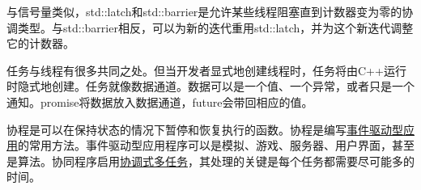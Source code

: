 与信号量类似，std::latch和std::barrier是允许某些线程阻塞直到计数器变为零的协调类型。与std::barrier相反，可以为新的迭代重用std::latch，并为这个新迭代调整它的计数器。

任务与线程有很多共同之处。但当开发者显式地创建线程时，任务将由C++运行时隐式地创建。任务就像数据通道。数据可以是一个值、一个异常，或者只是一个通知。promise将数据放入数据通道，future会带回相应的值。

协程是可以在保持状态的情况下暂停和恢复执行的函数。协程是编写\href{https://en.wikipedia.org/wiki/Event-driven_programming}{事件驱动型应用}的常用方法。事件驱动型应用程序可以是模拟、游戏、服务器、用户界面，甚至是算法。协同程序启用\href{https://de.wikipedia.org/wiki/Multitasking}{协调式多任务}，其处理的关键是每个任务都需要尽可能多的时间。